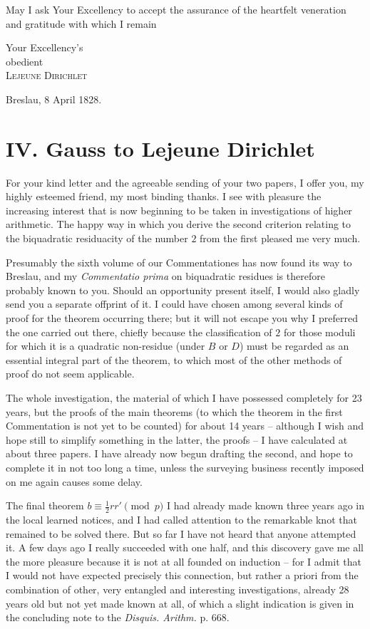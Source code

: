 \documentclass[11pt]{article}
\newcommand{\scn}[1]{\textsc{#1}}
\begin{document}
May I ask Your Excellency to accept the assurance of the heartfelt veneration and gratitude with which I remain

\begin{flushright}
Your Excellency's\\
obedient\\
\scn{Lejeune Dirichlet}
\end{flushright}
Breslau, 8 April 1828.

\section*{IV. Gauss to Lejeune Dirichlet}

For your kind letter and the agreeable sending of your two papers, I offer you, my highly esteemed friend, my most binding thanks. I see with pleasure the increasing interest that is now beginning to be taken in investigations of higher arithmetic. The happy way in which you derive the second criterion relating to the biquadratic residuacity of the number $2$ from the first pleased me very much.

Presumably the sixth volume of our Commentationes has now found its way to Breslau, and my \emph{Commentatio prima} on biquadratic residues is therefore probably known to you. Should an opportunity present itself, I would also gladly send you a separate offprint of it. I could have chosen among several kinds of proof for the theorem occurring there; but it will not escape you why I preferred the one carried out there, chiefly because the classification of $2$ for those moduli for which it is a quadratic non-residue (under $B$ or $D$) must be regarded as an essential integral part of the theorem, to which most of the other methods of proof do not seem applicable.

The whole investigation, the material of which I have possessed completely for 23 years, but the proofs of the main theorems (to which the theorem in the first Commentation is not yet to be counted) for about 14 years -- although I wish and hope still to simplify something in the latter, the proofs -- I have calculated at about three papers. I have already now begun drafting the second, and hope to complete it in not too long a time, unless the surveying business recently imposed on me again causes some delay.

The final theorem $b\equiv\frac12 rr'\pmod p$ I had already made known three years ago in the local learned notices, and I had called attention to the remarkable knot that remained to be solved there. But so far I have not heard that anyone attempted it. A few days ago I really succeeded with one half, and this discovery gave me all the more pleasure because it is not at all founded on induction -- for I admit that I would not have expected precisely this connection, but rather a priori from the combination of other, very entangled and interesting investigations, already 28 years old but not yet made known at all, of which a slight indication is given in the concluding note to the \emph{Disquis. Arithm.} p. 668.
\end{document}
